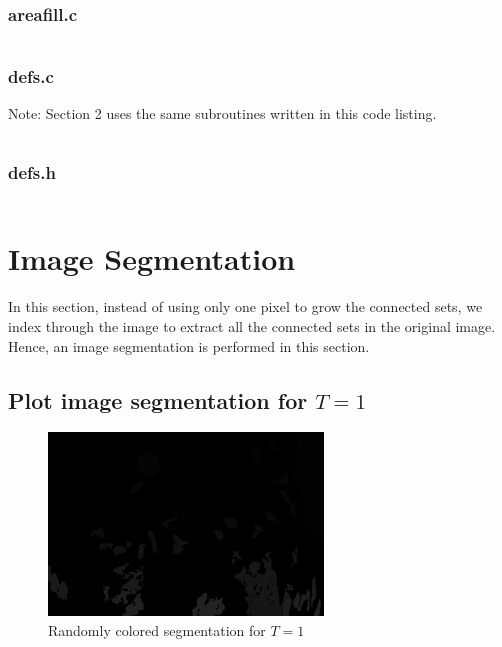 \documentclass{article}
\begin{document}
	\subsubsection{areafill.c}
		\inputminted[tabsize=4,breaklines]{c}{areafill.c}
	\subsubsection{defs.c}
		Note: Section 2 uses the same subroutines written
		in this code listing.
		\inputminted[tabsize=4,breaklines]{c}{defs.c}
	\subsubsection{defs.h}
		\inputminted[tabsize=4,breaklines]{c}{defs.h}

\pagebreak

\section{Image Segmentation}
	In this section, instead of using only one pixel to grow the connected
	sets, we index through the image to extract all the connected sets in
	the original image. Hence, an image segmentation is performed in this
	section.

\subsection{Plot image segmentation for $T=1$}
	\begin{figure}[h]
		\begin{center}
			\includegraphics[width=0.65\textwidth]{img22gd2_sm1.png}
			\caption{Randomly colored segmentation for $T=1$}
		\end{center}
	\end{figure}
\end{document}
